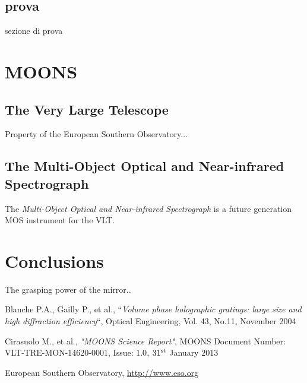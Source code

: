 \documentclass[Lau, oneside]{sapthesis}%
\begin{document}
\section{prova}
\label{sec:prova}
sezione di prova

\chapter{MOONS}
\label{chap:2}
\section{The Very Large Telescope}
Property of the European Southern Observatory...

\section{The Multi-Object Optical and Near-infrared Spectrograph}
\label{sec:moons}

The \textit{Multi-Object Optical and Near-infrared Spectrograph} is a future generation MOS instrument for the VLT. 

\chapter{Conclusions}
\label{chap:3}
The grasping power of the mirror..

\backmatter
{}
\begin{thebibliography}{17}

Blanche P.A., Gailly P., et al., “\textit{Volume phase holographic gratings: large size and high diffraction efficiency}“, Optical Engineering, Vol. 43, No.11, November 2004

Cirasuolo M., et al., \textit{"MOONS Science Report"}, MOONS Document Number: VLT-TRE-MON-14620-0001, Issue: $1.0$, $31^{\textup{st}}$ January $2013$

European Southern Observatory, \url{http://www.eso.org}

\end{thebibliography}
\end{document}
